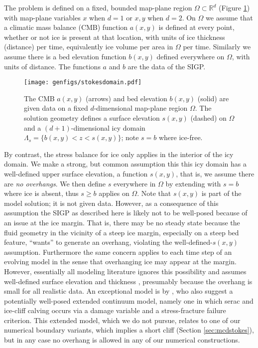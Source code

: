 \documentclass[letterpaper,final,12pt,reqno]{amsart}
\theoremstyle{claim}
\newcommand{\RR}{\mathbb{R}}
\numberwithin{equation}{section}
\numberwithin{figure}{section}
\numberwithin{table}{section}
\numberwithin{theorem}{section}
\begin{document}
The problem is defined on a fixed, bounded map-plane region $\Omega \subset \RR^d$ (Figure \ref{fig:stokesdomain}) with map-plane variables $x$ when $d=1$ or $x,y$ when $d=2$.  On $\Omega$ we assume that a climatic mass balance (CMB) function $a(x,y)$ is defined at every point, whether or not ice is present at that location, with units of ice thickness (distance) per time, equivalently ice volume per area in $\Omega$ per time.  Similarly we assume there is a bed elevation function $b(x,y)$ defined everywhere on $\Omega$, with units of distance.  The functions $a$ and $b$ are the data of the SIGP.

\begin{figure}[t]
\begin{center}
\texttt{[image: genfigs/stokesdomain.pdf]}
\end{center}
\caption{The CMB $a(x,y)$ (arrows) and bed elevation $b(x,y)$ (solid) are given data on a fixed $d$-dimensional map-plane region $\Omega$.  The solution geometry defines a surface elevation $s(x,y)$ (dashed) on $\Omega$ and a $(d+1)$-dimensional icy domain $\Lambda_s = \{b(x,y) < z < s(x,y)\}$; note $s=b$ where ice-free.}
\label{fig:stokesdomain}
\end{figure}

By contrast, the stress balance for ice only applies in the interior of the icy domain.  We make a strong, but common \cite[for example]{IsaacStadlerGhattas2015,Jouvetetal2008,Lengetal2012,WirbelJarosch2020} assumption this this icy domain has a well-defined upper surface elevation, a function $s(x,y)$, that is, we assume there are \emph{no overhangs}.  We then define $s$ everywhere in $\Omega$ by extending with $s=b$ where ice is absent, thus $s\ge b$ applies on $\Omega$.  Note that $s(x,y)$ is part of the model solution; it is not given data.  However, as a consequence of this assumption the SIGP as described here is likely not to be well-posed because of an issue at the ice margin.  That is, there may be no steady state because the fluid geometry in the vicinity of a steep ice margin, especially on a steep bed feature, ``wants'' to generate an overhang, violating the well-defined-$s(x,y)$ assumption.  Furthermore the same concern applies to each time step of an evolving model in the sense that overhanging ice may appear at the margin.  However, essentially all modeling literature ignores this possibility and assumes well-defined surface elevation and thickness \cite{Jouvetetal2008,Lengetal2012,WirbelJarosch2020}, presumably because the overhang is small for all realistic data.  An exceptional model is by \cite{PralongFunk2005}, who also suggest a potentially well-posed extended continuum model, namely one in which serac and ice-cliff calving occurs via a damage variable and a stress-fracture failure criterion.  This extended model, which we do not pursue, relates to one of our numerical boundary variants, which implies a short cliff (Section \ref{sec:mcdstokes}), but in any case no overhang is allowed in any of our numerical constructions.
\end{document}
